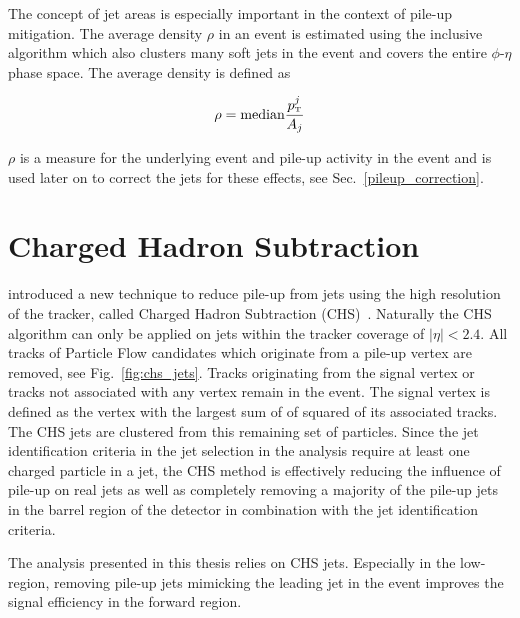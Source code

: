 The concept of jet areas is especially important in the context of pile-up
mitigation. The average \pt density $\rho$ in an event is estimated using the inclusive
\kt algorithm which also clusters many soft jets in the event and covers the
entire $\phi$-$\eta$ phase space. The average \pt density is defined as

\begin{equation*}
    \rho = \text{median} \frac{\pt^j}{A_j}
\end{equation*}

$\rho$ is a measure for the underlying event and pile-up activity in the event
and is used later on to correct the jets for these effects, see
Sec.~\ref{pileup_correction}.

\section{Charged Hadron Subtraction}
\label{sec:chs_algorithm}


\CMS introduced a new technique to reduce pile-up from jets using the high
resolution of the tracker, called Charged Hadron Subtraction
(CHS)~\cite{Kirschenmann:2014dla}. Naturally the CHS algorithm can only be
applied on jets within the tracker coverage of $|\eta| < 2.4$. All tracks of
Particle Flow candidates which originate from a pile-up vertex are removed, see
Fig.~\ref{fig:chs_jets}. Tracks originating from the signal vertex or tracks not
associated with any vertex remain in the event. The signal vertex is defined as
the vertex with the largest sum of of \pt squared of its associated tracks. The
CHS jets are clustered from this remaining set of particles. Since the jet
identification criteria in the jet selection in the analysis require at least
one charged particle in a jet, the CHS method is effectively reducing the
influence of pile-up on real jets as well as completely removing a majority of
the pile-up jets in the barrel region of the \CMS detector in combination with
the jet identification criteria.

The analysis presented in this thesis relies on CHS jets. Especially in the
low-\pt region, removing pile-up jets mimicking the leading jet in the event
improves the signal efficiency in the forward region.

